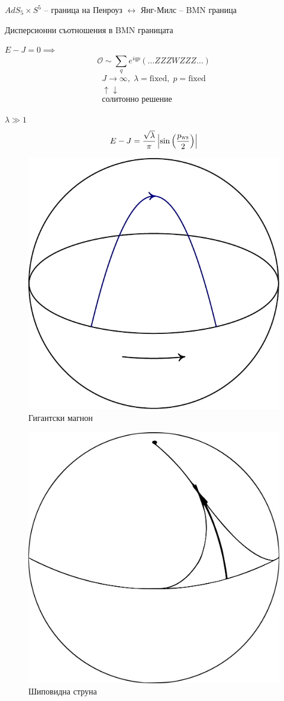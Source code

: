 \documentclass[bulg]{beamer}
\begin{document}
  \begin{frame}{}
  $AdS_5\times S^5$ -- граница на Пенроуз $\leftrightarrow$ Янг-Милс -- BMN граница 
  \begin{minipage}[t]{0.6\linewidth}%
  \begin{alertblock}{Дисперсионни съотношения в BMN границата}
  \item $E-J =0\implies$
  \begin{equation*}
    \mathcal{O} \sim \sum_q e^{iqp}\left(\ldots ZZZWZZZ\ldots\right)
  \end{equation*}
  \vspace{-0.5cm}
  \begin{gather*}
    J \rightarrow \infty,\;\lambda = \text{fixed},\; p = \text{fixed}
    \\
    \uparrow\downarrow\\
    \text{солитонно решение}
  \end{gather*}
\end{alertblock}
  $\lambda\gg 1$
  \begin{equation*}
    E-J=\frac{\sqrt{\lambda}}{\pi}\left|\sin \left(\frac{p_{\textsc{ws}}}{2}\right)\right|
  \end{equation*}
\end{minipage}%
  \begin{minipage}[t]{.4\textwidth}
    \vspace{0.2cm}
    \flushright
    \flushbottom
  \begin{figure}
      \centering
      \includegraphics[width=0.4\linewidth]{./images/magnon.pdf}
      \caption{Гигантски магнон}
      \label{figure1}
  \end{figure}
  \begin{figure}
      \centering
      \includegraphics[width=0.4\linewidth]{./images/spike.png}
      \caption{Шиповидна струна}
      \label{figure2}
  \end{figure}
  \end{minipage}%
  \end{frame}
\end{document}
